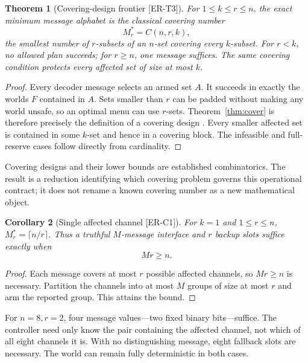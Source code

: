 \documentclass[11pt,a4paper]{article}
\newtheorem{theorem}{Theorem}
\newtheorem{corollary}[theorem]{Corollary}
\theoremstyle{definition}\newtheorem{definition}{Definition}
\newcommand{\idtag}[1]{\textnormal{\textsf{[#1]}}}
\begin{document}
\begin{theorem}[Covering-design frontier \idtag{ER-T3}]
\label{thm:design}
For $1\leq k\leq r\leq n$, the exact minimum message alphabet is the classical covering number
\begin{equation}
\boxed{M_r^*=C(n,r,k),}
\label{eq:design}
\end{equation}
the smallest number of $r$-subsets of an $n$-set covering every $k$-subset. For $r<k$, no allowed plan succeeds; for $r\geq n$, one message suffices. The same covering condition protects every affected set of size at most $k$.
\end{theorem}
\begin{proof}
Every decoder message selects an armed set $A$. It succeeds in exactly the worlds $F$ contained in $A$. Sets smaller than $r$ can be padded without making any world unsafe, so an optimal menu can use $r$-sets. Theorem~\ref{thm:cover} is therefore precisely the definition of a covering design \cite{bailey}. Every smaller affected set is contained in some $k$-set and hence in a covering block. The infeasible and full-reserve cases follow directly from cardinality.
\end{proof}
Covering designs and their lower bounds are established combinatorics. The result is a reduction identifying which covering problem governs this operational contract; it does not rename a known covering number as a new mathematical object.

\begin{corollary}[Single affected channel \idtag{ER-C1}]
\label{cor:single}
For $k=1$ and $1\leq r\leq n$, $M_r^*=\lceil n/r\rceil$. Thus a truthful $M$-message interface and $r$ backup slots suffice exactly when
\begin{equation}
\boxed{Mr\geq n.}
\label{eq:product}
\end{equation}
\end{corollary}
\begin{proof}
Each message covers at most $r$ possible affected channels, so $Mr\geq n$ is necessary. Partition the channels into at most $M$ groups of size at most $r$ and arm the reported group. This attains the bound.
\end{proof}
For $n=8,r=2$, four message values---two fixed binary bits---suffice. The controller need only know the pair containing the affected channel, not which of all eight channels it is. With no distinguishing message, eight fallback slots are necessary. The world can remain fully deterministic in both cases.
\end{document}
